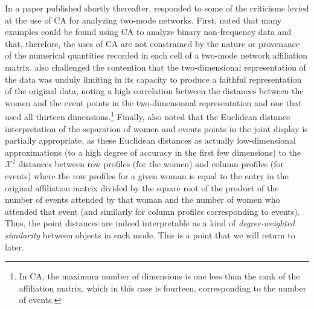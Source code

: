 \documentclass[a4paper,fleqn]{cas-sc}
\begin{document}
In a paper published shortly thereafter, \citet{roberts2000correspondence} responded to some of the criticisms \citet{borgatti1997network} levied at the use of CA for analyzing two-mode networks. First, \citet{roberts2000correspondence} noted that many examples could be found using CA to analyze binary non-frequency data and that, therefore, the uses of CA are not constrained by the nature or provenance of the numerical quantities recorded in each cell of a two-mode network affiliation matrix. \citet{roberts2000correspondence} also challenged the contention that the two-dimensional representation of the data was unduly limiting in its capacity to produce a faithful representation of the original data, noting a high correlation between the distances between the women and the event points in the two-dimensional representation and one that used all thirteen dimensions.\footnote{In CA, the maximum number of dimensions is one less than the rank of the affiliation matrix, which in this case is fourteen, corresponding to the number of events.} Finally, \citet{roberts2000correspondence} also noted that the Euclidean distance interpretation of the separation of women and events points in the joint display is partially appropriate, as these Euclidean distances as actually low-dimensional approximations (to a high degree of accuracy in the first few dimensions) to the $\mathcal{X}^2$ distances between row profiles (for the women) and column profiles (for events) where the row profiles for a given woman is equal to the entry in the original affiliation matrix divided by the square root of the product of the number of events attended by that woman and the number of women who attended that event (and similarly for column profiles corresponding to events). Thus, the point distances are indeed interpretable as a kind of \textit{degree-weighted similarity} between objects in each mode. This is a point that we will return to later.   
\end{document}
